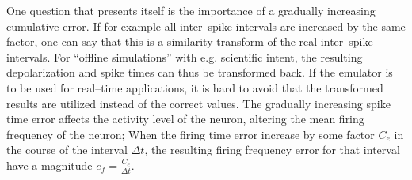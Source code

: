 	One question that presents itself is the importance of a gradually increasing cumulative error.
	If for example all inter--spike intervals are increased by the same factor, one can say that this is a similarity transform of 
		the real inter--spike intervals. %
	For ``offline simulations'' with e.g. scientific intent, the resulting depolarization and spike times can thus be transformed back.
	If the emulator is to be used for real--time applications, it is hard to avoid that the transformed results are utilized instead of the correct values.
%
	The gradually increasing spike time error affects the activity level of the neuron, altering the mean firing frequency of the neuron;
		When the firing time error increase by some factor $C_{e}$ in the course of the interval $\Delta t$, 
		the resulting firing frequency error for that interval have a magnitude $e_f = \frac{C_e}{\Delta t}$.
	

